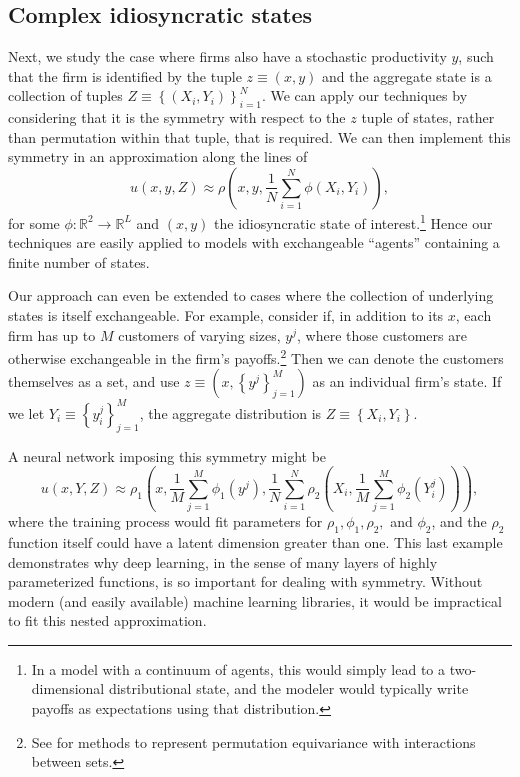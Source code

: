 \documentclass[12pt]{article}
\newcommand{\set}[1]{\ensuremath{\left\{{#1}\right\}}}
\begin{document}
\subsection{Complex idiosyncratic states}

Next, we study the case where firms also have a stochastic productivity $y$, such that the firm is identified by the tuple $z \equiv (x, y)$ and the aggregate state is a collection of tuples $Z \equiv \set{(X_i,Y_i)}_{i=1}^N$. We can apply our techniques by considering that it is the symmetry with respect to the $z$ tuple of states, rather than permutation within that tuple, that is required. We can then implement this symmetry in an approximation along the lines of
\begin{equation*}
u(x, y, Z) \approx \rho \left(x, y, \frac{1}{N}\sum_{i=1}^{N} \phi(X_i, Y_i) \right), 
\end{equation*}
for some $\phi : \mathbb{R}^2 \to \mathbb{R}^L$ and $(x,y)$ the idiosyncratic state of interest.\footnote{In a model with a continuum of agents, this would simply lead to a two-dimensional distributional state, and the modeler would typically write payoffs as expectations using that distribution.} Hence our techniques are easily applied to models with exchangeable ``agents'' containing a finite number of states.

Our approach can even be extended to cases where the collection of underlying states is itself exchangeable. For example, consider if, in addition to its $x$, each firm has up to $M$ customers of varying sizes, $y^j$, where those customers are otherwise exchangeable in the firm's payoffs.\footnote{See \citet{hartford2018deep} for methods to represent permutation equivariance with interactions between sets.} Then we can denote the customers themselves as a set, and use  $z \equiv (x, \set{y^j}_{j = 1}^M)$ as an individual firm's state. If we let $Y_i \equiv \set{y^j_i}_{j = 1}^M$, the aggregate distribution is $Z \equiv \set{X_i, Y_i}$.  

A neural network imposing this symmetry might be
\begin{equation*}
u(x, Y, Z) \approx \rho_1 \left(x, \frac{1}{M}\sum_{j=1}^{M} \phi_1(y^j), \frac{1}{N}\sum_{i=1}^{N} \rho_2\left(X_i, \frac{1}{M}\sum_{j=1}^{M} \phi_2(Y^j_i)\right)\right),
\end{equation*}
where the training process would fit parameters for $\rho_1, \phi_1, \rho_2,$ and $\phi_2$, and the $\rho_2$ function itself could have a latent dimension greater than one. This last example demonstrates why deep learning, in the sense of many layers of highly parameterized functions, is so important for dealing with symmetry. Without modern (and easily available) machine learning libraries, it would be impractical to fit this nested approximation.
\end{document}
